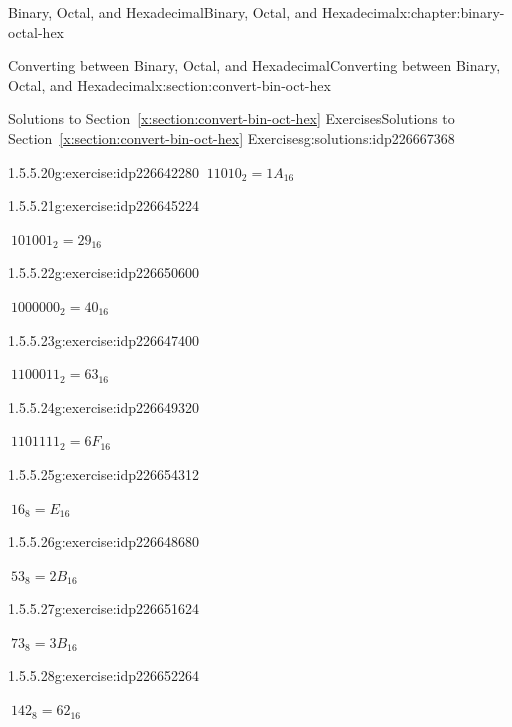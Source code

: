 \documentclass[twoside,10pt,]{book}
\newcommand{\xreffont}{\relax}
\numberwithin{equation}{section}
\begin{document}
\begin{chapterptx}{Binary, Octal, and Hexadecimal}{}{Binary, Octal, and Hexadecimal}{}{}{x:chapter:binary-octal-hex}
\begin{sectionptx}{Converting between Binary, Octal, and Hexadecimal}{}{Converting between Binary, Octal, and Hexadecimal}{}{}{x:section:convert-bin-oct-hex}
\begin{solutions-subsection}{Solutions to Section~{\xreffont\ref*{x:section:convert-bin-oct-hex}} Exercises}{}{Solutions to Section~{\xreffont\ref*{x:section:convert-bin-oct-hex}} Exercises}{}{}{g:solutions:idp226667368}
\begin{exercisegroup}
\begin{divisionsolutioneg}{1.5.5.20}{}{g:exercise:idp226642280}
\noindent\hypertarget{g:solution:idp226643560-main}{}\(\ 11010_2=1A_{16}\)\end{divisionsolutioneg}%
\begin{divisionsolutioneg}{1.5.5.21}{}{g:exercise:idp226645224}%
\par\smallskip%
\noindent\hypertarget{g:solution:idp226640744-main}{}\(\ 101001_2=29_{16}\)\end{divisionsolutioneg}%
\begin{divisionsolutioneg}{1.5.5.22}{}{g:exercise:idp226650600}%
\par\smallskip%
\noindent\hypertarget{g:solution:idp226651368-main}{}\(\ 1000000_2=40_{16}\)\end{divisionsolutioneg}%
\begin{divisionsolutioneg}{1.5.5.23}{}{g:exercise:idp226647400}%
\par\smallskip%
\noindent\hypertarget{g:solution:idp226649960-main}{}\(\ 1100011_2=63_{16}\)\end{divisionsolutioneg}%
\begin{divisionsolutioneg}{1.5.5.24}{}{g:exercise:idp226649320}%
\par\smallskip%
\noindent\hypertarget{g:solution:idp226654184-main}{}\(\ 1101111_2=6F_{16}\)\end{divisionsolutioneg}%
\end{exercisegroup}
\par\medskip\noindent
\begin{exercisegroup}
\begin{divisionsolutioneg}{1.5.5.25}{}{g:exercise:idp226654312}%
\par\smallskip%
\noindent\hypertarget{g:solution:idp226654440-main}{}\(\ 16_8=E_{16}\)\end{divisionsolutioneg}%
\begin{divisionsolutioneg}{1.5.5.26}{}{g:exercise:idp226648680}%
\par\smallskip%
\noindent\hypertarget{g:solution:idp226647528-main}{}\(\ 53_8=2B_{16}\)\end{divisionsolutioneg}%
\begin{divisionsolutioneg}{1.5.5.27}{}{g:exercise:idp226651624}%
\par\smallskip%
\noindent\hypertarget{g:solution:idp226649576-main}{}\(\ 73_8=3B_{16}\)\end{divisionsolutioneg}%
\begin{divisionsolutioneg}{1.5.5.28}{}{g:exercise:idp226652264}%
\par\smallskip%
\noindent\hypertarget{g:solution:idp226652648-main}{}\(\ 142_8=62_{16}\)\end{divisionsolutioneg}%

\end{exercisegroup}
\end{solutions-subsection}
\end{sectionptx}
\end{chapterptx}
\end{document}
